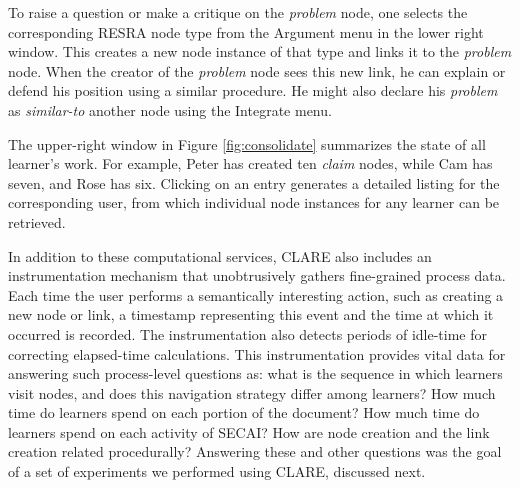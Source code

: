 To raise a question or make a critique on the {\em problem} node, one
selects the corresponding RESRA node type from the {\sf Argument\/} menu in
the lower right window. This creates a new node instance of that type and
links it to the {\em problem} node.  When the creator of the {\em problem}
node sees this new link, he can explain or defend his position using a
similar procedure. He might also declare his {\em problem} as {\sl
similar-to\/} another node using the {\sf Integrate\/} menu.

The upper-right window in Figure \ref{fig:consolidate} summarizes the state
of all learner's work. For example, Peter has created ten {\em claim}
nodes, while Cam has seven, and Rose has six. Clicking on an entry
generates a detailed listing for the corresponding user, from which
individual node instances for any learner can be retrieved.

\begin{figure*}[htb]
  \centerline{}
  \label{fig:consolidate}
\end{figure*}

In addition to these computational services, CLARE also includes an
instrumentation mechanism that unobtrusively gathers fine-grained process
data. Each time the user performs a semantically interesting action, such
as creating a new node or link, a timestamp representing this event and the
time at which it occurred is recorded. The instrumentation also detects
periods of idle-time for correcting elapsed-time calculations.  This
instrumentation provides vital data for answering such process-level
questions as: what is the sequence in which learners visit nodes, and does
this navigation strategy differ among learners? How much time do learners
spend on each portion of the document? How much time do learners spend on
each activity of SECAI?  How are node creation and the link creation
related procedurally?  Answering these and other questions was the goal of 
a set of experiments we performed using CLARE, discussed next. 


